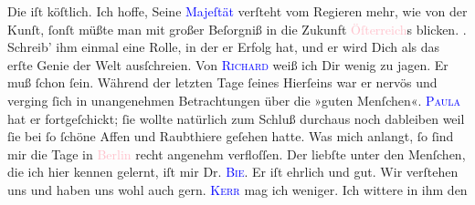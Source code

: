           \pstart
           Die \label{K_L02784-5v}\label{K_L02784-5h} iſt köſtlich. Ich hoffe, Seine \textcolor{blue}{Majeſtät}{} verſteht vom Regieren mehr, wie von der Kunſt, {\pb}ſonſt müßte man mit großer Beſorgniß in die Zukunft
                  \textcolor{pink}{Öſterreich}{}\ledrightnote{\textcolor{pink}{Österreich}}s blicken. \label{K_L02784-3v}\label{K_L02784-3h}. Schreib’  ihm einmal eine Rolle, in der
               er Erfolg hat, und er wird Dich als das erſte Genie der Welt ausſchreien.\pend
           \pstart
           Von \textsc{\textcolor{blue}{Richard}{}\ledrightnote{\textcolor{blue}{Richard Beer-Hofmann}}} weiß ich Dir wenig zu jagen. Er muß ſchon \label{K_L02784-6v}\label{K_L02784-6h} ſein. Während der letzten Tage ſeines Hierſeins war er nervös und verging
               ſich in unangenehmen Betrachtungen über die »guten Menſchen«. \textsc{\textcolor{blue}{Paula}{}\ledrightnote{\textcolor{blue}{Paula Beer-Hofmann}}} hat er {\pb}fortgeſchickt; ſie wollte natürlich
               zum Schluß durchaus noch dableiben weil ſie bei \label{K_L02784-7v}\label{K_L02784-7h} ſo ſchöne Affen und Raubthiere geſehen hatte.\pend
           \pstart
           Was mich anlangt, ſo ſind mir die Tage in \textcolor{pink}{Berlin}{}\ledrightnote{\textcolor{pink}{Berlin}}
               recht angenehm verfloſſen. Der liebſte unter den Menſchen, die ich hier kennen
               gelernt, iſt mir Dr. \textsc{\textcolor{blue}{Bie}{}\ledrightnote{\textcolor{blue}{Oskar Bie}}}. Er iſt ehrlich und gut. Wir verſtehen uns und haben uns wohl auch gern. \textsc{\textcolor{blue}{Kerr}{}\ledrightnote{\textcolor{blue}{Alfred Kerr}}} mag ich weniger. Ich wittere in ihm {\pb}den
